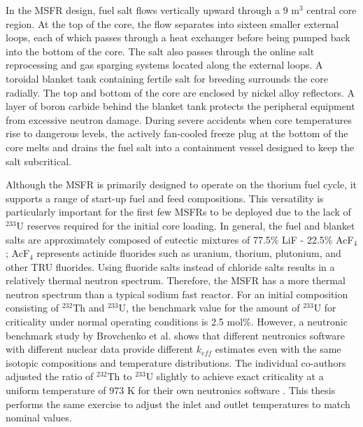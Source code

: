In the \gls{MSFR} design, fuel salt flows vertically upward through a 9 m$^3$
central core region. At the top of the core, the flow separates into sixteen
smaller external loops, each of which passes through a heat exchanger before
being pumped back into the bottom of the core. The salt also passes through
the online salt reprocessing and gas sparging systems located along the
external loops. A toroidal blanket tank containing fertile salt for breeding
surrounds the core radially. The top and bottom of the core are enclosed
by nickel alloy reflectors. A layer of boron carbide behind the blanket tank
protects the peripheral equipment from excessive neutron damage. During severe
accidents when core temperatures rise to dangerous levels, the actively
fan-cooled freeze plug at the bottom of the core melts and drains the fuel
salt into a containment vessel designed to keep the salt subcritical. 

Although the \gls{MSFR} is primarily designed to operate on the thorium fuel
cycle, it supports a range of start-up fuel and feed compositions. This
versatility is particularly important for the first few \glspl{MSFR} to be
deployed due to the lack of $^{233}$U reserves required for the initial core
loading. In general, the fuel and blanket salts are approximately composed of
eutectic mixtures of 77.5\% LiF - 22.5\% AcF$_4$; AcF$_4$ represents
actinide fluorides such as uranium, thorium, plutonium, and other \gls{TRU}
fluorides. Using fluoride salts instead of chloride salts results in a
relatively thermal neutron spectrum. Therefore, the \gls{MSFR} has a more
thermal neutron spectrum than a typical sodium fast reactor. For an initial
composition consisting of $^{232}$Th and $^{233}$U,
the benchmark value for the amount of $^{233}$U for criticality under
normal operating conditions is 2.5 mol\%. However, a neutronic benchmark
study by Brovchenko et al. \cite{brovchenko_neutronic_2019} shows that
different neutronics software with different nuclear data provide
different $k_{eff}$ estimates even with the same isotopic compositions and
temperature distributions. The individual co-authors adjusted the
ratio of $^{232}$Th to $^{233}$U slightly to achieve exact criticality at a
uniform temperature of 973 K for their own neutronics software
\cite{brovchenko_neutronic_2019}. This thesis
performs the same exercise to adjust the inlet and outlet temperatures to
match nominal values.

